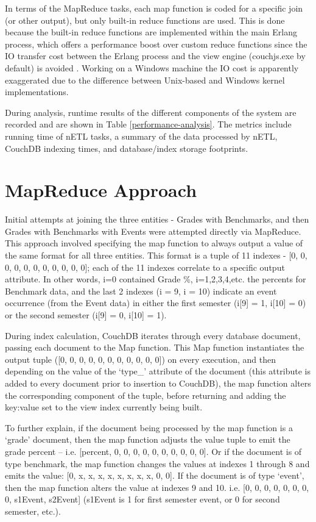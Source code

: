 In terms of the MapReduce tasks, each map function is coded for a specific join (or other output), but only built-in reduce functions are used. This is done because the built-in reduce functions are implemented within the main Erlang process, which offers a performance boost over custom reduce functions since the IO transfer cost between the Erlang process and the view engine (couchjs.exe by default) is avoided \cite{slack1Nov}. Working on a Windows machine the IO cost is apparently exaggerated due to the difference between Unix-based and Windows kernel implementations.

During analysis, runtime results of the different components of the system are recorded and are shown in Table \ref{performance-analysis}. The metrics include running time of nETL tasks, a summary of the data processed by nETL, CouchDB indexing times, and database/index storage footprints.



\section{MapReduce Approach}
Initial attempts at joining the three entities - Grades with Benchmarks, and then Grades with Benchmarks with Events were attempted directly via MapReduce. This approach involved specifying the map function to always output a value of the same format for all three entities. This format is a tuple of 11 indexes - [0, 0, 0, 0, 0, 0, 0, 0, 0, 0, 0]; each of the 11 indexes correlate to a specific output attribute. In other words, i=0 contained Grade \%, i=1,2,3,4,etc. the percents for Benchmark data, and the last 2 indexes (i = 9, i = 10) indicate an event occurrence (from the Event data) in either the first semester (i[9] = 1, i[10] = 0) or the second semester (i[9] = 0, i[10] = 1).

During index calculation, CouchDB iterates through every database document, passing each document to the Map function. This Map function instantiates the output tuple ([0, 0, 0, 0, 0, 0, 0, 0, 0, 0, 0]) on every execution, and then depending on the value of the `type\_' attribute of the document (this attribute is added to every document prior to insertion to CouchDB), the map function alters the corresponding component of the tuple, before returning and adding the key:value set to the view index currently being built.

To further explain, if the document being processed by the map function is a ‘grade’ document, then the map function adjusts the value tuple to emit the grade percent – i.e. [percent, 0, 0, 0, 0, 0, 0, 0, 0, 0, 0]. Or if the document is of type benchmark, the map function changes the values at indexes 1 through 8 and emits the value: [0, x, x, x, x, x, x, x, x, 0, 0]. If the document is of type ‘event’, then the map function alters the value at indexes 9 and 10. i.e. [0, 0, 0, 0, 0, 0, 0, 0, s1Event, s2Event] (s1Event is 1 for first semester event, or 0 for second semester, etc.).

